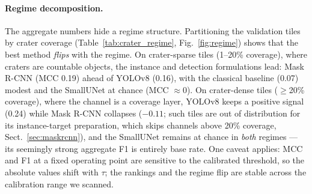 \paragraph{Regime decomposition.}
The aggregate numbers hide a regime structure. Partitioning the validation tiles by crater coverage (Table~\ref{tab:crater_regime}, Fig.~\ref{fig:regime}) shows that the best method \emph{flips} with the regime. On crater-sparse tiles (1--20\% coverage), where craters are countable objects, the instance and detection formulations lead: Mask R-CNN (MCC 0.19) ahead of YOLOv8 (0.16), with the classical baseline (0.07) modest and the SmallUNet at chance (MCC $\approx 0$). On crater-dense tiles ($\geq$20\% coverage), where the channel is a coverage layer, YOLOv8 keeps a positive signal (0.24) while Mask R-CNN collapses ($-0.11$; such tiles are out of distribution for its instance-target preparation, which skips channels above 20\% coverage, Sect.~\ref{sec:maskrcnn}), and the SmallUNet remains at chance in \emph{both} regimes --- its seemingly strong aggregate F1 is entirely base rate. One caveat applies: MCC and F1 at a fixed operating point are sensitive to the calibrated threshold, so the absolute values shift with $\tau$; the rankings and the regime flip are stable across the calibration range we scanned.

\begin{table}[htbp]
\centering
\caption{Impact crater by coverage regime (spatial validation split; per-method, per-regime calibrated $\tau$). The preferable formulation flips between regimes.}
\label{tab:crater_regime}
\end{table}

